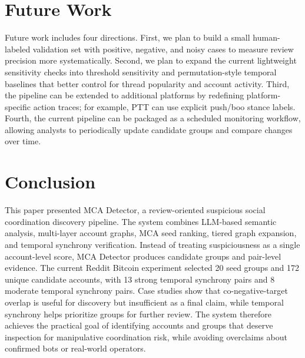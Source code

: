\documentclass[conference]{IEEEtran}
\begin{document}
\section{Future Work}

Future work includes four directions. First, we plan to build a small
human-labeled validation set with positive, negative, and noisy cases to
measure review precision more systematically. Second, we plan to expand the
current lightweight sensitivity checks into threshold sensitivity and
permutation-style temporal baselines that better control for thread popularity
and account activity. Third, the pipeline can be extended to additional
platforms by redefining platform-specific action traces; for example, PTT can
use explicit push/boo stance labels. Fourth, the current pipeline can be
packaged as a scheduled monitoring workflow, allowing analysts to periodically
update candidate groups and compare changes over time.

\section{Conclusion}

This paper presented MCA Detector, a review-oriented suspicious social
coordination discovery pipeline. The system combines LLM-based semantic
analysis, multi-layer account graphs, MCA seed ranking, tiered graph expansion,
and temporal synchrony verification. Instead of treating suspiciousness as a
single account-level score, MCA Detector produces candidate groups and
pair-level evidence. The current Reddit Bitcoin experiment selected 20 seed
groups and 172 unique candidate accounts, with 13 strong temporal synchrony
pairs and 8 moderate temporal synchrony pairs. Case studies show that
co-negative-target overlap is useful for discovery but insufficient as a final
claim, while temporal synchrony helps prioritize groups for further review.
The system therefore achieves the practical goal of identifying accounts and
groups that deserve inspection for manipulative coordination risk, while
avoiding overclaims about confirmed bots or real-world operators.

\balance
\end{document}
